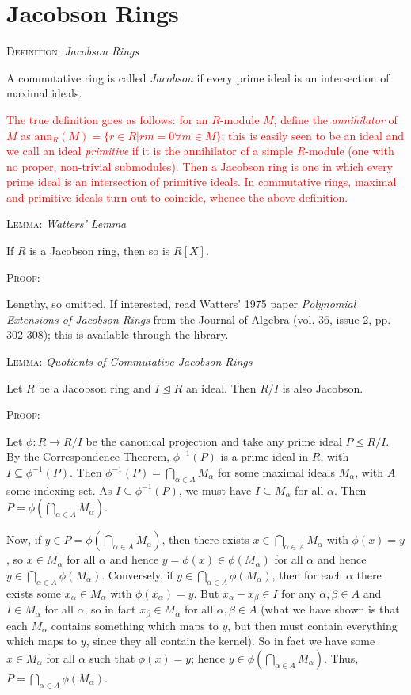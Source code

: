 \documentclass[12pt,a4paper]{article}
\newcommand{\proof}{\noindent\textsc{\large Proof:}\par}
\newcommand{\defn}[1]{\noindent\textsc{\large Definition:}  \textit{\large #1}\par}
\newcommand{\lemma}[1]{\noindent\textsc{\large Lemma:}  \textit{\large #1}\par}
\newcommand{\red}[1]{\textcolor{red}{#1}}
\newcommand{\gap}{\par \vspace{5mm}}
\let\ideal\trianglelefteq
\begin{document}
\section{Jacobson Rings}

\defn{Jacobson Rings}
A commutative ring is called \textit{Jacobson} if every prime ideal is an intersection of maximal ideals.

\red{The true definition goes as follows: for an $R$-module $M$, define the \textit{annihilator} of $M$ as $\mathrm{ann}_R(M)=\{r\in R | rm=0\forall m\in M\}$; this is easily seen to be an ideal and we call an ideal \textit{primitive} if it is the annihilator of a simple $R$-module (one with no proper, non-trivial submodules). Then a Jacobson ring is one in which every prime ideal is an intersection of primitive ideals. In commutative rings, maximal and primitive ideals turn out to coincide, whence the above definition.}\gap

\lemma{Watters' Lemma}
If $R$ is a Jacobson ring, then so is $R[X]$.\gap

\proof
Lengthy, so omitted. If interested, read Watters' 1975 paper \textit{Polynomial Extensions of Jacobson Rings} from the Journal of Algebra (vol. 36, issue 2, pp. 302-308); this is available through the library.\gap

\lemma{Quotients of Commutative Jacobson Rings}
Let $R$ be a Jacobson ring and $I\ideal R$ an ideal. Then $R/I$ is also Jacobson.\gap

\proof
Let $\phi:R\to R/I$ be the canonical projection and take any prime ideal $P\ideal R/I$. By the Correspondence Theorem, $\phi^{-1}(P)$ is a prime ideal in $R$, with $I\subseteq \phi^{-1}(P)$. Then $\phi^{-1}(P)=\bigcap_{\alpha\in A}M_\alpha$ for some maximal ideals $M_\alpha$, with $A$ some indexing set. As $I\subseteq \phi^{-1}(P)$, we must have $I\subseteq M_\alpha$ for all $\alpha$. Then $P=\phi\left(\bigcap_{\alpha\in A}M_\alpha\right)$.

Now, if $y\in P=\phi\left(\bigcap_{\alpha\in A}M_\alpha\right)$, then there exists $x\in \bigcap_{\alpha\in A}M_\alpha$ with $\phi(x)=y$, so $x\in M_\alpha$ for all $\alpha$ and hence $y=\phi(x)\in \phi(M_\alpha)$ for all $\alpha$ and hence $y\in \bigcap_{\alpha\in A}\phi(M_\alpha)$. Conversely, if $y\in\bigcap_{\alpha \in A}\phi(M_\alpha)$, then for each $\alpha$ there exists some $x_\alpha\in M_\alpha$ with $\phi(x_\alpha)=y$. But $x_\alpha-x_\beta\in I$ for any $\alpha,\beta\in A$ and $I\in M_\alpha$ for all $\alpha$, so in fact $x_\beta\in M_\alpha$ for all $\alpha, \beta \in A$ (what we have shown is that each $M_\alpha$ contains something which maps to $y$, but then must contain everything which maps to $y$, since they all contain the kernel). So in fact we have some $x\in M_\alpha$ for all $\alpha$ such that $\phi(x)=y$; hence $y\in \phi\left(\bigcap_{\alpha\in A}M_\alpha\right)$. Thus, $P=\bigcap_{\alpha\in A}\phi(M_\alpha)$.
\end{document}

